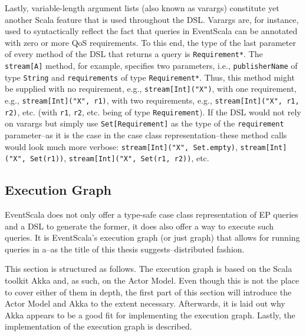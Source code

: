 \documentclass[article, type=bsc, colorback, accentcolor=tud8b, parskip=half, bibliography=totocnumbered]{tudthesis}
\begin{document}
Lastly, variable-length argument lists (also known as varargs) constitute yet another Scala feature that is used throughout the DSL.
Varargs are, for instance, used to syntactically reflect the fact that queries in EventScala can be annotated with zero or more QoS requirements.
To this end, the type of the last parameter of every method of the DSL that returns a query is \lstinline{Requirement*}.
The \lstinline{stream[A]} method, for example, specifies two parameters, i.e., \lstinline{publisherName} of type \lstinline{String} and \lstinline{requirements} of type \lstinline{Requirement*}.
Thus, this method might be supplied with no requirement, e.g., \lstinline{stream[Int]("X")}, with one requirement, e.g., \lstinline{stream[Int]("X", r1)}, with two requirements, e.g., \lstinline{stream[Int]("X", r1, r2)}, etc. (with \lstinline{r1}, \lstinline{r2}, etc. being of type \lstinline{Requirement}).
If the DSL would not rely on varargs but simply use \lstinline{Set[Requirement]} as the type of the \lstinline{requirement} parameter--as it is the case in the case class representation--these method calls would look much more verbose:
\lstinline{stream[Int]("X", Set.empty)}, \lstinline{stream[Int]("X", Set(r1))}, \lstinline{stream[Int]("X", Set(r1, r2))}, etc.

\subsection{Execution Graph}
\label{sec:execution_graph}

EventScala does not only offer a type-safe case class representation of EP queries and a DSL to generate the former, it does also offer a way to execute such queries.
It is EventScala's execution graph (or just graph) that allows for running queries in a--as the title of this thesis suggests--distributed fashion.

This section is structured as follows.
The execution graph is based on the Scala toolkit Akka and, as such, on the Actor Model.
Even though this is not the place to cover either of them in depth, the first part of this section will introduce the Actor Model and Akka to the extent necessary.
Afterwards, it is laid out why Akka appears to be a good fit for implementing the execution graph.
Lastly, the implementation of the execution graph is described.
\end{document}
